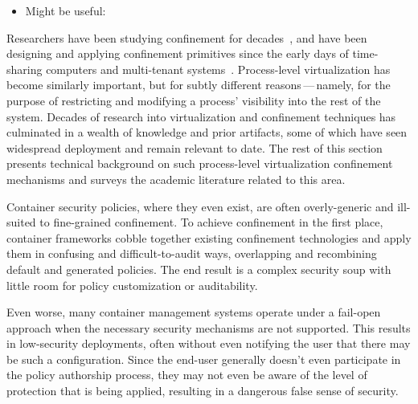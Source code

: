 \begin{inprogress}
  \begin{itemize}
    \item Might be useful: \cite{dranger2006_dac_complexity}
  \end{itemize}

Researchers have been studying confinement for decades~\cite{lampson1973_confinement}, and
have been designing and applying confinement primitives since the early days of
time-sharing computers and multi-tenant systems~\cite{shu2016_security_isolation_study}.
Process-level virtualization has become similarly important, but for subtly different
reasons\,---\,namely, for the purpose of restricting and modifying a process' visibility
into the rest of the system.  Decades of research into virtualization and confinement
techniques has culminated in a wealth of knowledge and prior artifacts, some of which have
seen widespread deployment and remain relevant to date. The rest of this section presents
technical background on such process-level virtualization confinement mechanisms and
surveys the academic literature related to this area.
\end{inprogress}


\begin{inprogress}
  Container security policies, where they even exist, are often overly-generic and
  ill-suited to fine-grained confinement. To achieve confinement in the first place,
  container frameworks cobble together existing confinement technologies and apply them in
  confusing and difficult-to-audit ways, overlapping and recombining default and generated
  policies. The end result is a complex security soup with little room for policy
  customization or auditability. 

  Even worse, many container management systems operate under a fail-open approach when the
  necessary security mechanisms are not supported. This results in low-security deployments,
  often without even notifying the user that there may be such a configuration. Since the
  end-user generally doesn't even participate in the policy authorship process, they may not
  even be aware of the level of protection that is being applied, resulting in a dangerous
  false sense of security. 
\end{inprogress}
